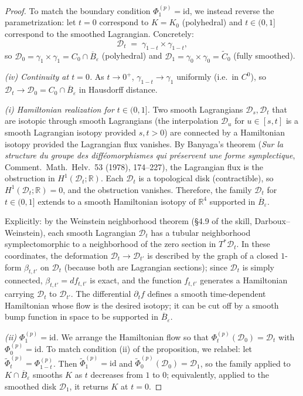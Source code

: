 \documentclass[12pt]{article}
\theoremstyle{definition}
\begin{document}
\begin{proof}
To match the boundary condition $\Phi_1^{(p)}=\mathrm{id}$, we instead reverse the parametrization: let $t=0$ correspond to $K=K_0$ (polyhedral) and $t\in(0,1]$ correspond to the smoothed Lagrangian. Concretely:
\begin{equation}\label{eq:Dt-final}
\mathcal{D}_t \;=\; \gamma_{1-t}\times\gamma_{1-t},
\end{equation}
so $\mathcal{D}_0 = \gamma_1\times\gamma_1 = C_0\cap\overline{B}_\varepsilon$ (polyhedral) and $\mathcal{D}_1 = \gamma_0\times\gamma_0 = \widetilde{C}_0$ (fully smoothed).

\emph{(iv) Continuity at $t=0$.} As $t\to 0^+$, $\gamma_{1-t}\to\gamma_1$ uniformly (i.e.\ in $C^0$), so $\mathcal{D}_t\to\mathcal{D}_0=C_0\cap\overline{B}_\varepsilon$ in Hausdorff distance.

\emph{(i) Hamiltonian realization for $t\in(0,1]$.} Two smooth Lagrangians $\mathcal{D}_s,\mathcal{D}_t$ that are isotopic through smooth Lagrangians (the interpolation $\mathcal{D}_u$ for $u\in[s,t]$ is a smooth Lagrangian isotopy provided $s,t>0$) are connected by a Hamiltonian isotopy provided the Lagrangian flux vanishes. By Banyaga's theorem (\emph{Sur la structure du groupe des diff\'eomorphismes qui pr\'eservent une forme symplectique}, Comment.\ Math.\ Helv.\ 53 (1978), 174--227), the Lagrangian flux is the obstruction in $H^1(\mathcal{D}_t;\mathbb{R})$. Each $\mathcal{D}_t$ is a topological disk (contractible), so $H^1(\mathcal{D}_t;\mathbb{R})=0$, and the obstruction vanishes. Therefore, the family $\mathcal{D}_t$ for $t\in(0,1]$ extends to a smooth Hamiltonian isotopy of $\mathbb{R}^4$ supported in $\overline{B}_\varepsilon$.

Explicitly: by the Weinstein neighborhood theorem (\S 4.9 of the skill, Darboux--Weinstein), each smooth Lagrangian $\mathcal{D}_t$ has a tubular neighborhood symplectomorphic to a neighborhood of the zero section in $T^*\mathcal{D}_t$. In these coordinates, the deformation $\mathcal{D}_t\to\mathcal{D}_{t'}$ is described by the graph of a closed $1$-form $\beta_{t,t'}$ on $\mathcal{D}_t$ (because both are Lagrangian sections); since $\mathcal{D}_t$ is simply connected, $\beta_{t,t'}=df_{t,t'}$ is exact, and the function $f_{t,t'}$ generates a Hamiltonian carrying $\mathcal{D}_t$ to $\mathcal{D}_{t'}$. The differential $\partial_t f$ defines a smooth time-dependent Hamiltonian whose flow is the desired isotopy; it can be cut off by a smooth bump function in space to be supported in $\overline{B}_\varepsilon$.

\emph{(ii) $\Phi_1^{(p)}=\mathrm{id}$.} We arrange the Hamiltonian flow so that $\Phi_t^{(p)}(\mathcal{D}_0)=\mathcal{D}_t$ with $\Phi_0^{(p)}=\mathrm{id}$. To match condition (ii) of the proposition, we relabel: let $\widetilde\Phi_t^{(p)}=\Phi_{1-t}^{(p)}$. Then $\widetilde\Phi_1^{(p)}=\mathrm{id}$ and $\widetilde\Phi_0^{(p)}(\mathcal{D}_0)=\mathcal{D}_1$, so the family applied to $K\cap\overline{B}_\varepsilon$ smooths $K$ as $t$ decreases from $1$ to $0$; equivalently, applied to the smoothed disk $\mathcal{D}_1$, it returns $K$ at $t=0$.


\end{proof}
\end{document}
